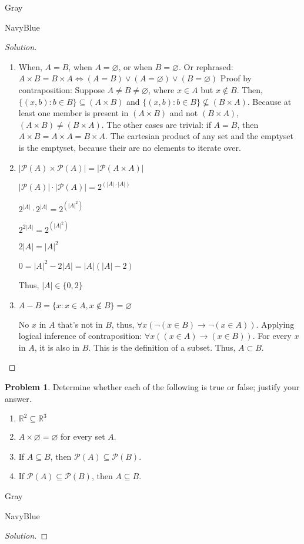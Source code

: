 \documentclass[12pt]{amsart}
\newcounter{problem_number}[section]
\theoremstyle{named}
\newenvironment{soln}
{\begin{color}{Gray}\begin{framed}\begin{color}{NavyBlue}\begin{proof}[Solution]
\doublespacing}
{\end{proof}\end{color}\end{framed}\end{color}}
\theoremstyle{definition}
\newtheorem{problem}{Problem}
\newcommand{\R}{\mathbb R}
\begin{document}
\begin{soln} 
    \begin{enumerate}
        \item When, $A = B$, when $A = \varnothing$, or when $B = \varnothing$.
        Or rephrased: $A\times B = B\times A \iff  (A = B) \lor (A =
        \varnothing) \lor (B = \varnothing)$ Proof by contraposition: Suppose $A
        \neq B \neq \varnothing$, where $ x \in A $ but $x \notin B$. Then,
        $\{(x,b) : b \in B \} \subseteq (A \times B)$ and  $\{(x,b) : b \in B \}
        \nsubseteq (B \times A)$. Because at least one member is present in $(A
        \times B)$ and not $(B \times A)$, $(A \times B) \neq (B \times A)$. The
        other cases are trivial: if $A = B$, then $A \times B = A \times A = B
        \times A$. The cartesian product of any set and the emptyset is the
        emptyset, because their are no elements to iterate over. 
        \item $|\mathscr P(A)\times\mathscr P(A)| = |\mathscr P(A\times A)|$ 
        
        $|\mathscr P(A)| \cdot |\mathscr P(A)| = 2^{(|A| \cdot |A|)}$

        $2^{|A|} \cdot 2^{|A|} = 2^{(|A|^{2})}$

        $2^{2|A|} = 2^{(|A|^{2})}$

        $2|A| = |A|^2$

        $0 = |A|^2 - 2|A| = |A|(|A| - 2)$


        
        Thus, $|A| \in \{0,2\}$

        \item $ A - B = \{x : x \in A, x \notin B\} = \varnothing$
        
        No $x$ in $A$ that's not in $B$, thus, $\forall x(\lnot(x \in B)
        \rightarrow \lnot(x \in A))$. Applying logical inference of
        contraposition: $\forall x((x \in A) \rightarrow (x \in B))$. For every
        $x$ in $A$, it is also in $B$. This is the definition of a subset. Thus,
        $A \subset B$. 
    \end{enumerate}
	
\end{soln}
\begin{problem}
	Determine whether each of the following is true or false; justify your answer.
	\begin{enumerate}
		\item $\R^2\subseteq\R^3$
		\item $A\times\varnothing = \varnothing$ for every set $A$.
		\item If $A\subseteq B$, then $\mathscr P(A)\subseteq\mathscr P(B)$.	
		\item If $\mathscr P(A)\subseteq\mathscr P(B)$, then $A\subseteq B$. 
	\end{enumerate}
	
\end{problem}

\begin{soln}
	
\end{soln}
\end{document}
